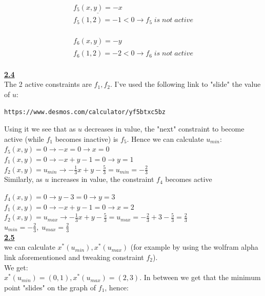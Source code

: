 \documentclass[fleqn]{article}
\begin{document}
\begin{multline*}
\underline{f_5(x,y) = -x} \\
f_5(1,2) = -1<0 \rightarrow \boxed{f_5 \; is \; not \; active}
\end{multline*} \\

\begin{multline*}
\underline{f_6(x,y) = -y} \\
f_6(1,2) = -2<0 \rightarrow \boxed{f_6 \; is \; not \; active}
\end{multline*} \\

\underline{\textbf{2.4}} \\
The 2 active constraints are $f_1, f_2$. I've used the following link to "slide" the value of $u$:
\begin{lstlisting}[breaklines]
https://www.desmos.com/calculator/yf5btxc5bz
\end{lstlisting} 

Using it we see that as $u$ decreases in value, the "next" constraint to become active (while $f_1$ becomes inactive) is $f_5$. Hence we can calculate $u_{min}$: \\

$f_5(x,y)=0 \rightarrow -x=0 \rightarrow x=0$\\

$f_1(x,y)=0 \rightarrow -x+y-1=0 \rightarrow y=1$\\

$f_2(x,y)=u_{min} \rightarrow -\frac{1}{3}x+y-\frac{5}{3}=u_{min} =
-\frac{2}{3}$\\


Similarly, as $u$ increases in value, the constraint $f_4$ becomes active

$f_4(x,y)=0 \rightarrow y-3=0 \rightarrow y=3$\\

$f_1(x,y)=0 \rightarrow -x+y-1=0 \rightarrow x=2$\\

$f_2(x,y)=u_{max} \rightarrow -\frac{1}{3}x+y-\frac{5}{3}=u_{max} =
-\frac{2}{3}+3-\frac{5}{3} = \frac{2}{3}$\\


$u_{min} = -\frac{2}{3}, \; u_{max} = \frac{2}{3}$\\


\underline{\textbf{2.5}} \\
we can calculate $x^*(u_{min}), x^*(u_{max})$ (for example by using the wolfram alpha link aforementioned and tweaking constraint $f_2$).\\
We get: \\
$x^*(u_{min}) = (0,1), x^*(u_{max}) = (2,3)$. In between we get that the minimum point "slides" on the graph of $f_1$, hence: \\
\end{document}
